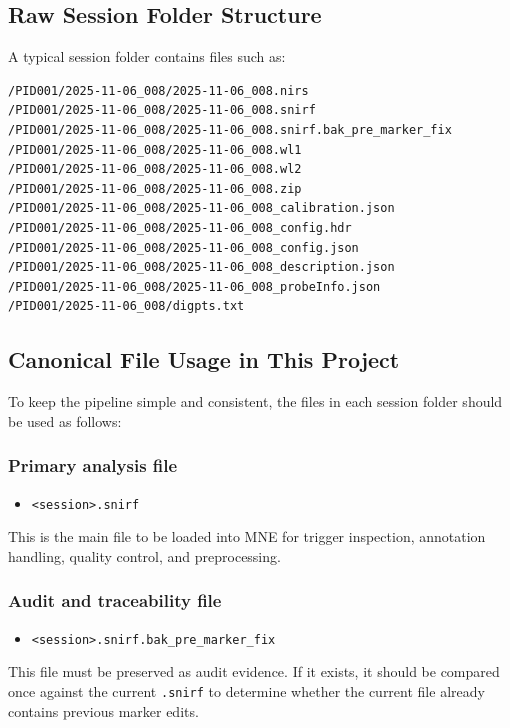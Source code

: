 \subsection{Raw Session Folder Structure}
A typical session folder contains files such as:
\begin{verbatim}
/PID001/2025-11-06_008/2025-11-06_008.nirs
/PID001/2025-11-06_008/2025-11-06_008.snirf
/PID001/2025-11-06_008/2025-11-06_008.snirf.bak_pre_marker_fix
/PID001/2025-11-06_008/2025-11-06_008.wl1
/PID001/2025-11-06_008/2025-11-06_008.wl2
/PID001/2025-11-06_008/2025-11-06_008.zip
/PID001/2025-11-06_008/2025-11-06_008_calibration.json
/PID001/2025-11-06_008/2025-11-06_008_config.hdr
/PID001/2025-11-06_008/2025-11-06_008_config.json
/PID001/2025-11-06_008/2025-11-06_008_description.json
/PID001/2025-11-06_008/2025-11-06_008_probeInfo.json
/PID001/2025-11-06_008/digpts.txt
\end{verbatim}

\subsection{Canonical File Usage in This Project}
To keep the pipeline simple and consistent, the files in each session folder should be used as follows:

\subsubsection*{Primary analysis file}
\begin{itemize}
    \item \texttt{<session>.snirf}
\end{itemize}

This is the main file to be loaded into MNE for trigger inspection, annotation handling,
quality control, and preprocessing.

\subsubsection*{Audit and traceability file}
\begin{itemize}
    \item \texttt{<session>.snirf.bak\_pre\_marker\_fix}
\end{itemize}

This file must be preserved as audit evidence.
If it exists, it should be compared once against the current \texttt{.snirf} to determine whether
the current file already contains previous marker edits.

